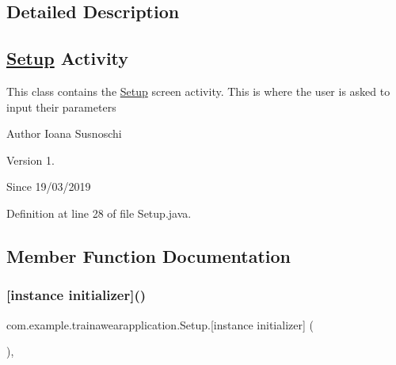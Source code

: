 \subsection{Detailed Description}
\subsection*{\mbox{\hyperlink{classcom_1_1example_1_1trainawearapplication_1_1_setup}{Setup}} Activity}

This class contains the \mbox{\hyperlink{classcom_1_1example_1_1trainawearapplication_1_1_setup}{Setup}} screen activity. This is where the user is asked to input their parameters

\begin{DoxyAuthor}{Author}
Ioana Susnoschi 
\end{DoxyAuthor}
\begin{DoxyVersion}{Version}
1. 
\end{DoxyVersion}
\begin{DoxySince}{Since}
19/03/2019 
\end{DoxySince}


Definition at line 28 of file Setup.\+java.



\subsection{Member Function Documentation}
\mbox{\label{classcom_1_1example_1_1trainawearapplication_1_1_setup_a542b0abbc72cfa04647cf2a63393d415}} 
\subsubsection{\texorpdfstring{[instance initializer]()}{[instance initializer]()}}
{\footnotesize\ttfamily com.\+example.\+trainawearapplication.\+Setup.\mbox{[}instance initializer\mbox{]} (\begin{DoxyParamCaption}{ }\end{DoxyParamCaption})\hspace{0.3cm}{\ttfamily [inline]}, {\ttfamily [package]}}

